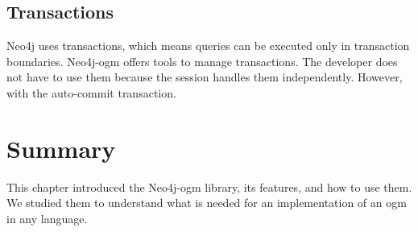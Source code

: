 \subsection{Transactions}

Neo4j uses transactions, which means queries can be executed only in transaction boundaries. Neo4j-\acrshort{ogm}
offers tools to manage transactions. The developer does not have to use them because the session handles them independently. However, with the auto-commit transaction.

\section{Summary}

This chapter introduced the Neo4j-\acrshort{ogm} library, its features, and how to use them. We studied them to understand what is needed for
an implementation of an \acrshort{ogm} in any language.